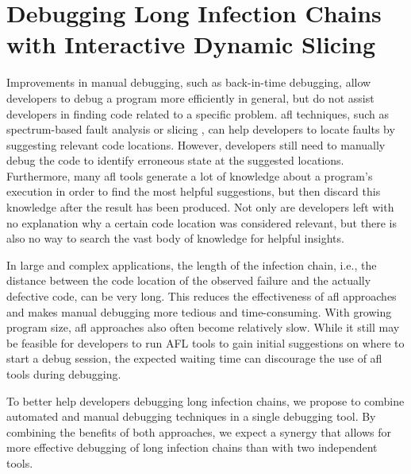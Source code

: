 \chapter{Debugging Long Infection Chains with Interactive Dynamic Slicing}
\label{sec:ids}


Improvements in manual debugging, such as back-in-time debugging, allow developers to debug a program more efficiently in general, but do not assist developers in finding code related to a specific problem.
\Acf{afl} techniques, such as spectrum-based fault analysis or slicing , can help developers to locate faults by suggesting relevant code locations.
However, developers still need to manually debug the code to identify erroneous state at the suggested locations.
Furthermore, many \ac{afl} tools generate a lot of knowledge about a program's execution in order to find the most helpful suggestions, but then discard this knowledge after the result has been produced.
Not only are developers left with no explanation why a certain code location was considered relevant, but there is also no way to search the vast body of knowledge for helpful insights.

In large and complex applications, the length of the infection chain, i.e., the distance between the code location of the observed failure and the actually defective code, can be very long.
This reduces the effectiveness of \ac{afl} approaches and makes manual debugging more tedious and time-consuming.
With growing program size, \ac{afl} approaches also often become relatively slow.
While it still may be feasible for developers to run AFL tools to gain initial suggestions on where to start a debug session, the expected waiting time can discourage the use of \ac{afl} tools during debugging.

To better help developers debugging long infection chains, we propose to combine automated and manual debugging techniques in a single debugging tool. 
By combining the benefits of both approaches, we expect a synergy that allows for more effective debugging of long infection chains than with two independent tools.

